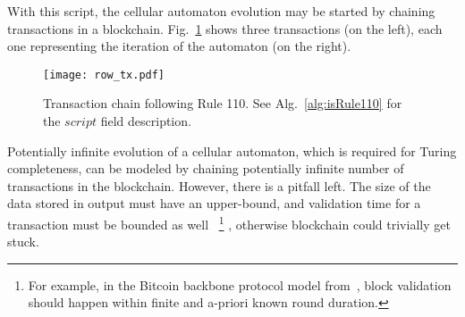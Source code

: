\documentclass[runningheads]{llncs}
\begin{document}
    With this script, the cellular automaton evolution may be started by
    chaining transactions in a blockchain. Fig.~\ref{fig:txs} shows three
    transactions (on the left), each one representing the iteration of the
    automaton (on the right).

    \begin{figure}[h]
        \centering
        \texttt{[image: row\_tx.pdf]}
        \caption{Transaction chain following Rule 110. See
            Alg.~\ref{alg:isRule110} for the
            $script$ field description.
        \label{fig:txs} }
    \end{figure}

    Potentially infinite evolution of a cellular automaton, which is
    required for Turing completeness, can be modeled by chaining potentially infinite
    number of transactions in the blockchain. However, there is a pitfall left.
    The size of the data stored in output must have an upper-bound, and validation
    time for a transaction must be bounded as well
    ~\footnote{For example, in the Bitcoin backbone protocol model from~\cite{garay2015bitcoin}, block validation
    should happen within finite and a-priori known round duration.}
    , otherwise blockchain could trivially get stuck.
\end{document}

